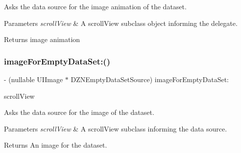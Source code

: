 Asks the data source for the image animation of the dataset.


\begin{DoxyParams}{Parameters}
{\em scroll\+View} & A scroll\+View subclass object informing the delegate.\\
\hline
\end{DoxyParams}
\begin{DoxyReturn}{Returns}
image animation 
\end{DoxyReturn}
\mbox{\label{protocol_d_z_n_empty_data_set_source_01-p_a68909f5e8562ff7b941f0141fcb9be31}} 
\subsubsection{\texorpdfstring{image\+For\+Empty\+Data\+Set\+:()}{imageForEmptyDataSet:()}}
{\footnotesize\ttfamily -\/ (nullable U\+I\+Image $\ast$ D\+Z\+N\+Empty\+Data\+Set\+Source) image\+For\+Empty\+Data\+Set\+: \begin{DoxyParamCaption}\item[{(U\+I\+Scroll\+View $\ast$)}]{scroll\+View }\end{DoxyParamCaption}\hspace{0.3cm}{\ttfamily [optional]}}

Asks the data source for the image of the dataset.


\begin{DoxyParams}{Parameters}
{\em scroll\+View} & A scroll\+View subclass informing the data source. \\
\hline
\end{DoxyParams}
\begin{DoxyReturn}{Returns}
An image for the dataset. 
\end{DoxyReturn}
\mbox{\label{protocol_d_z_n_empty_data_set_source_01-p_a2689805f9cd2ce77d7a48da96e8e59f0}} 
